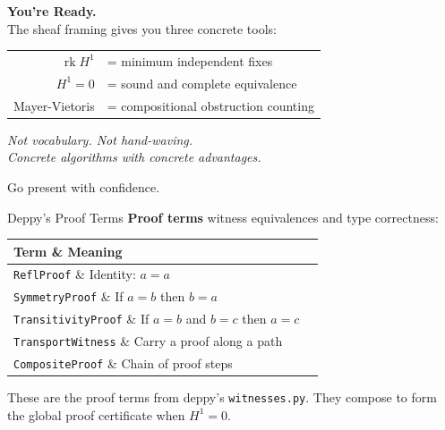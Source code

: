 \documentclass[aspectratio=169,10pt]{beamer}
\newcommand{\rk}{\operatorname{rk}}
\begin{document}
\begin{frame}[plain]
\begin{center}
\vspace{1.5cm}
{\Large\textbf{You're Ready.}}\\[1em]
{\normalsize The sheaf framing gives you three concrete tools:}\\[0.5em]
\begin{tabular}{@{}rl@{}}
$\rk H^1$ & = minimum independent fixes \\
$H^1 = 0$ & = sound and complete equivalence \\
Mayer-Vietoris & = compositional obstruction counting
\end{tabular}

\vspace{1em}
{\small\textit{Not vocabulary. Not hand-waving.\\
Concrete algorithms with concrete advantages.}}

\vspace{1em}
{\footnotesize Go present with confidence.}
\end{center}
\end{frame}



\begin{frame}{Deppy's Proof Terms}
\textbf{Proof terms} witness equivalences and type correctness:

\vspace{0.3em}
\renewcommand{\arraystretch}{1.3}
\begin{tabular}{@{}lp{7.5cm}@{}}
\toprule
\textbf{Term} \& \textbf{Meaning} \\
\midrule
\texttt{ReflProof} \& Identity: $a = a$ \\
\texttt{SymmetryProof} \& If $a = b$ then $b = a$ \\
\texttt{TransitivityProof} \& If $a = b$ and $b = c$ then $a = c$ \\
\texttt{TransportWitness} \& Carry a proof along a path \\
\texttt{CompositeProof} \& Chain of proof steps \\
\bottomrule
\end{tabular}

\vspace{0.3em}
These are the proof terms from deppy's \texttt{witnesses.py}. They compose to form the global proof certificate when $H^1 = 0$.
\end{frame}
\end{document}
